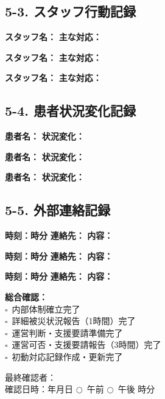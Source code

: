 \documentclass[a4paper,12pt]{jarticle}
\newcommand{\checkbox}{$\square$\ }
\newcommand{\underlinespace}[1]{\underline{\hspace{#1}}}
\newcommand{\circlecheck}{$\bigcirc$\ }
\begin{document}
\vspace{3mm}

\subsection*{5-3. スタッフ行動記録}

\textbf{スタッフ名：} \underlinespace{4cm} \quad \textbf{主な対応：} \underlinespace{8cm}

\textbf{スタッフ名：} \underlinespace{4cm} \quad \textbf{主な対応：} \underlinespace{8cm}

\textbf{スタッフ名：} \underlinespace{4cm} \quad \textbf{主な対応：} \underlinespace{8cm}

\vspace{3mm}

\subsection*{5-4. 患者状況変化記録}

\textbf{患者名：} \underlinespace{3cm} \quad \textbf{状況変化：} \underlinespace{9cm}

\textbf{患者名：} \underlinespace{3cm} \quad \textbf{状況変化：} \underlinespace{9cm}

\textbf{患者名：} \underlinespace{3cm} \quad \textbf{状況変化：} \underlinespace{9cm}

\vspace{3mm}

\subsection*{5-5. 外部連絡記録}

\textbf{時刻：\underlinespace{1cm}時\underlinespace{1cm}分} \quad \textbf{連絡先：} \underlinespace{5cm} \quad \textbf{内容：} \underlinespace{6cm}

\textbf{時刻：\underlinespace{1cm}時\underlinespace{1cm}分} \quad \textbf{連絡先：} \underlinespace{5cm} \quad \textbf{内容：} \underlinespace{6cm}

\textbf{時刻：\underlinespace{1cm}時\underlinespace{1cm}分} \quad \textbf{連絡先：} \underlinespace{5cm} \quad \textbf{内容：} \underlinespace{6cm}

\vspace{5mm}

\noindent
\textbf{総合確認：} \\
\checkbox 内部体制確立完了 \\
\checkbox 詳細被災状況報告（1時間）完了 \\
\checkbox 運営判断・支援要請準備完了 \\
\checkbox 運営可否・支援要請報告（3時間）完了 \\
\checkbox 初動対応記録作成・更新完了

\vspace{5mm}

\noindent
最終確認者：\underlinespace{4cm} \\
\vspace{3mm}
確認日時：\underlinespace{2cm}年\underlinespace{1cm}月\underlinespace{1cm}日 \quad \circlecheck 午前 \quad \circlecheck 午後 \quad \underlinespace{1cm}時\underlinespace{1cm}分
\end{document}
